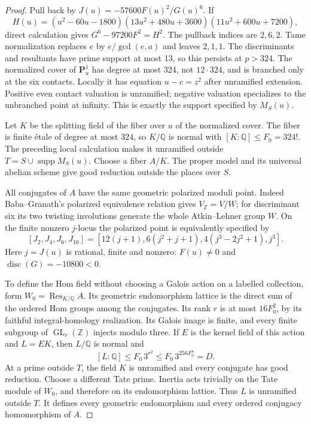 \documentclass[11pt]{article}
\theoremstyle{definition}
\theoremstyle{remark}
\begin{document}
\begin{proof}
Pull back by $J(u)=-57600F(u)^2/G(u)^6$. If
\[
 H(u)=(u^2-60u-1800)(13u^2+480u+3600)(11u^2+600u+7200),
\]
direct calculation gives $G^6-97200F^2=H^2$. The pullback indices are
$2,6,2$. Tame normalization replaces $e$ by $e/\gcd(e,a)$ and leaves
$2,1,1$. The discriminants and resultants have prime support at most 13,
so this persists at $p>324$. The normalized cover of $\mathbf P^1_u$
has degree at most 324, not $12\cdot324$, and is branched only at the
six contacts. Locally it has equation $u-c=z^2$ after unramified
extension. Positive even contact valuation is unramified; negative
valuation specializes to the unbranched point at infinity. This is
exactly the support specified by $M_S(u)$.

Let $K$ be the splitting field of the fiber over $u$ of the normalized
cover. The fiber is finite \'{e}tale of degree at most $324$, so $K/\mathbb Q$
is normal with $[K:\mathbb Q]\le F_0=324!$. The preceding local
calculation makes it unramified outside
$T=S\cup\operatorname{supp}M_S(u)$. Choose a fiber $A/K$.
The proper model and its universal abelian scheme give good reduction
outside the places over $S$.

All conjugates of $A$ have the same geometric polarized moduli point.
Indeed Baba--Granath's polarized equivalence relation gives
$V_{\mathbb Z}=V/W$; for discriminant six its two twisting involutions
generate the whole Atkin--Lehner group $W$. On the finite nonzero
$j$-locus the polarized point is equivalently specified by
\[
 [J_2,J_4,J_6,J_{10}]
 =[12(j+1),6(j^2+j+1),4(j^3-2j^2+1),j^3].
\]
Here $j=J(u)$ is rational, finite and nonzero: $F(u)\ne0$ and
$\operatorname{disc}(G)=-10800<0$.

To define the Hom field without choosing a Galois action on a
labelled collection, form $W_0=\operatorname{Res}_{K/\mathbb Q}A$.
Its geometric endomorphism lattice is the direct sum of the ordered
Hom groups among the conjugates. Its rank $r$ is at most
$16F_0^2$, by its faithful integral-homology realization.
Its Galois image is finite, and every finite subgroup of
$\operatorname{GL}_r(\mathbb Z)$ injects modulo three. If $E$ is
the kernel field of this action and $L=EK$, then $L/\mathbb Q$ is
normal and
\[
 [L:\mathbb Q]\le F_0\,3^{r^2}
 \le F_0\,3^{256F_0^4}=D.
\]
At a prime outside $T$, the field $K$ is unramified and every
conjugate has good reduction. Choose a different Tate prime.
Inertia acts trivially on the Tate module of $W_0$, and therefore
on its endomorphism lattice. Thus $L$ is unramified outside $T$.
It defines every geometric endomorphism and every ordered
conjugacy homomorphism of $A$.


\end{proof}
\end{document}
